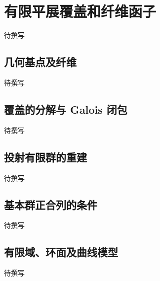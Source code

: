 
% 
% 

\section{有限平展覆盖和纤维函子}
\label{g5:sec:3501}

待撰写

\subsection{几何基点及纤维}
\label{g5:subsec:3501:01}
待撰写

\subsection{覆盖的分解与 Galois 闭包}
\label{g5:subsec:3501:02}
待撰写

\subsection{投射有限群的重建}
\label{g5:subsec:3501:03}
待撰写

\subsection{基本群正合列的条件}
\label{g5:subsec:3501:04}
待撰写

\subsection{有限域、环面及曲线模型}
\label{g5:subsec:3501:05}
待撰写
